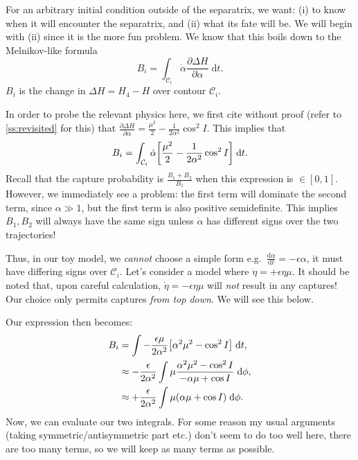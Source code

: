 \documentclass[11pt,
        usenames, %
        dvipsnames %
    ]{article}
\newcommand*{\rd}[2]{\frac{\mathrm{d}#1}{\mathrm{d}#2}}
\newcommand*{\pd}[2]{\frac{\partial#1}{\partial#2}}
\DeclarePairedDelimiter\p{\lparen}{\rparen}
\DeclarePairedDelimiter\s{\lbrack}{\rbrack}
\begin{document}
For an arbitrary initial condition outside of the separatrix, we want: (i) to
know when it will encounter the separatrix, and (ii) what its fate will be. We
will begin with (ii) since it is the more fun problem. We know that this boils
down to the Melnikov-like formula
\begin{equation}
    B_i = \int_{\mathcal{C}_i} \dot{\alpha}\pd{\Delta H}{\alpha}
        \;\mathrm{d}t.
\end{equation}
$B_i$ is the change in $\Delta H = H_4 - H$ over contour $\mathcal{C}_i$.

In order to probe the relevant physics here, we first cite without proof (refer
to \autoref{ss:revisited} for this) that $\pd{\Delta H}{\alpha} =
\frac{\mu^2}{2} - \frac{1}{2\alpha^2}\cos^2 I$. This implies that
\begin{equation}
    B_i = \int_{\mathcal{C}_i} \dot{\alpha}\s*{
        \frac{\mu^2}{2} - \frac{1}{2\alpha^2}\cos^2 I}
        \;\mathrm{d}t.
\end{equation}
Recall that the capture probability is $\frac{B_1 + B_2}{B_1}$ when this
expression is $\in [0, 1]$. However, we immediately see a problem: the first
term will dominate the second term, since $\alpha \gg 1$, but the first term is
also positive semidefinite. This implies $B_1, B_2$ will always have the same
sign unless $\dot{\alpha}$ has different signs over the two trajectories!

Thus, in our toy model, we \emph{cannot} choose a simple form e.g.\
$\rd{\alpha}{t} = -\epsilon\alpha$, it must have differing signs over
$\mathcal{C}_i$. Let's consider a model where $\dot{\eta} = +\epsilon \eta \mu$.
It should be noted that, upon careful calculation, $\dot{\eta} = -\epsilon \eta
\mu$ will \emph{not} result in any captures! Our choice only permits captures
\emph{from top down}. We will see this below.

Our expression then becomes:
\begin{align*}
    B_i &= \int -\frac{\epsilon \mu}{2\alpha^2}\s*{
        \alpha^2 \mu^2 - \cos^2 I}\;\mathrm{d}t,\\
        &\approx -\frac{\epsilon}{2\alpha^2} \int
            \mu \frac{\alpha^2 \mu^2 - \cos^2 I}{
                -\alpha \mu + \cos I}\;\mathrm{d}\phi,\\
        &\approx +\frac{\epsilon}{2\alpha^2}\int
            \mu\p*{\alpha \mu + \cos I}\;\mathrm{d}\phi.
\end{align*}
Now, we can evaluate our two integrals. For some reason my usual arguments
(taking symmetric/antisymmetric part etc.) don't seem to do too well here, there
are too many terms, so we will keep as many terms as possible.
\end{document}
